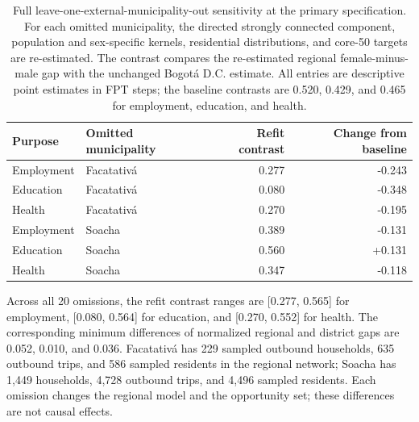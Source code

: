 \begin{table}[ht]
\centering
\caption{Full leave-one-external-municipality-out sensitivity at the primary specification. For each omitted municipality, the directed strongly connected component, population and sex-specific kernels, residential distributions, and core-50 targets are re-estimated. The contrast compares the re-estimated regional female-minus-male gap with the unchanged Bogotá D.C. estimate. All entries are descriptive point estimates in FPT steps; the baseline contrasts are 0.520, 0.429, and 0.465 for employment, education, and health.}
\label{tab:s11_municipality_refit}
\begin{tabular}{llrr}
\toprule
Purpose & Omitted municipality & Refit contrast & Change from baseline \\
\midrule
Employment & Facatativá & 0.277 & -0.243 \\
Education & Facatativá & 0.080 & -0.348 \\
Health & Facatativá & 0.270 & -0.195 \\
Employment & Soacha & 0.389 & -0.131 \\
Education & Soacha & 0.560 & +0.131 \\
Health & Soacha & 0.347 & -0.118 \\
\bottomrule
\end{tabular}

\smallskip
\footnotesize Across all 20 omissions, the refit contrast ranges are [0.277, 0.565] for employment, [0.080, 0.564] for education, and [0.270, 0.552] for health. The corresponding minimum differences of normalized regional and district gaps are 0.052, 0.010, and 0.036. Facatativá has 229 sampled outbound households, 635 outbound trips, and 586 sampled residents in the regional network; Soacha has 1,449 households, 4,728 outbound trips, and 4,496 sampled residents. Each omission changes the regional model and the opportunity set; these differences are not causal effects.
\end{table}
